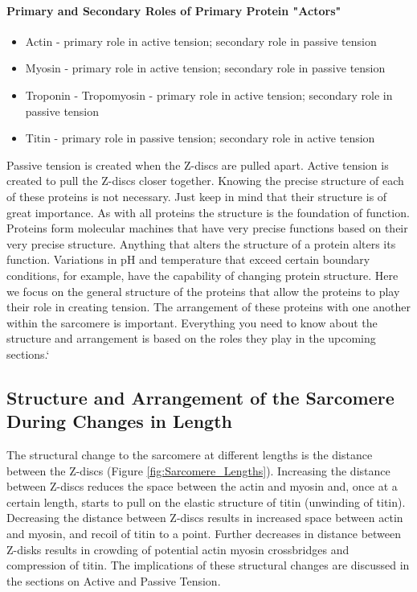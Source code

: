 \paragraph{Primary and Secondary Roles of Primary Protein "Actors"}
\begin{itemize}
\item Actin - primary role in active tension; secondary role in passive tension
\item Myosin - primary role in active tension; secondary role in passive tension
\item Troponin - Tropomyosin - primary role in active tension; secondary role in passive tension
\item Titin - primary role in passive tension; secondary role in active tension
\end{itemize}

Passive tension is created when the Z-discs are pulled apart. Active tension is created to pull the Z-discs closer together. Knowing the precise structure of each of these proteins is not necessary. Just keep in mind that their structure is of great importance. As with all proteins the structure is the foundation of function. Proteins form molecular machines that have very precise functions based on their very precise structure. Anything that alters the structure of a protein alters its function. Variations in pH and temperature that exceed certain boundary conditions, for example, have the capability of changing protein structure. Here we focus on the general structure of the proteins that allow the proteins to play their role in creating tension. The arrangement of these proteins with one another within the sarcomere is important. Everything you need to know about the structure and arrangement is based on the roles they play in the upcoming sections.`

\subsection{Structure and Arrangement of the Sarcomere During Changes in Length}

The structural change to the sarcomere at different lengths is the distance between the Z-discs (Figure \ref{fig:Sarcomere_Lengths}). Increasing the distance between Z-discs reduces the space between the actin and myosin and, once at a certain length, starts to pull on the elastic structure of titin (unwinding of titin). Decreasing the distance between Z-discs results in increased space between actin and myosin, and recoil of titin to a point. Further decreases in distance between Z-disks results in crowding of potential actin myosin crossbridges and compression of titin. The implications of these structural changes are discussed in the sections on Active and Passive Tension.

